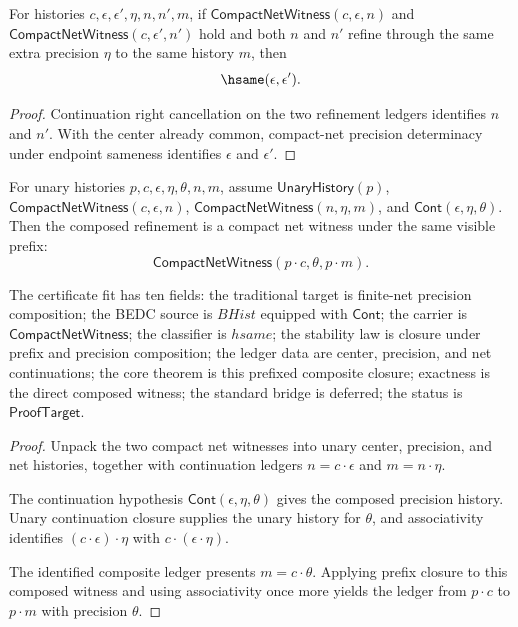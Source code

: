 \begin{theorem}
\label{thm:compact-net-witness-composite-precision-cont-deterministic}
For histories $c,\epsilon,\epsilon',\eta,n,n',m$, if
$\mathsf{CompactNetWitness}(c,\epsilon,n)$ and
$\mathsf{CompactNetWitness}(c,\epsilon',n')$ hold and both $n$ and $n'$ refine
through the same extra precision $\eta$ to the same history $m$, then
$$
\hsame(\epsilon,\epsilon').
$$
\end{theorem}
\begin{proof}
Continuation right cancellation on the two refinement ledgers identifies
$n$ and $n'$. With the center already common, compact-net precision
determinacy under endpoint sameness identifies $\epsilon$ and $\epsilon'$.
\end{proof}

\begin{theorem}
\label{thm:compact-net-witness-prefixed-composite-closed}
For unary histories $p,c,\epsilon,\eta,\theta,n,m$, assume
$\mathsf{UnaryHistory}(p)$,
$\mathsf{CompactNetWitness}(c,\epsilon,n)$,
$\mathsf{CompactNetWitness}(n,\eta,m)$, and
$\mathsf{Cont}(\epsilon,\eta,\theta)$. Then the composed refinement is a
compact net witness under the same visible prefix:
$$
\mathsf{CompactNetWitness}(p \cdot c,\theta,p \cdot m).
$$

The certificate fit has ten fields: the traditional target is finite-net
precision composition; the BEDC source is $BHist$ equipped with $\mathsf{Cont}$;
the carrier is $\mathsf{CompactNetWitness}$; the classifier is $hsame$; the
stability law is closure under prefix and precision composition; the ledger
data are center, precision, and net continuations; the core theorem is this
prefixed composite closure; exactness is the direct composed witness; the
standard bridge is deferred; the status is $\mathsf{ProofTarget}$.
\end{theorem}
\begin{proof}
Unpack the two compact net witnesses into unary center, precision, and net
histories, together with continuation ledgers $n=c\cdot\epsilon$ and
$m=n\cdot\eta$.

The continuation hypothesis $\mathsf{Cont}(\epsilon,\eta,\theta)$ gives the
composed precision history. Unary continuation closure supplies the unary
history for $\theta$, and associativity identifies
$(c\cdot\epsilon)\cdot\eta$ with $c\cdot(\epsilon\cdot\eta)$.

The identified composite ledger presents $m=c\cdot\theta$. Applying prefix
closure to this composed witness and using associativity once more yields the
ledger from $p\cdot c$ to $p\cdot m$ with precision $\theta$.
\end{proof}

